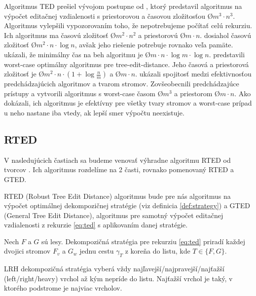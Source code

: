 Algoritmus TED prešiel vývojom postupne od \citet{TAI}, ktorý predstavil algoritmus
na výpočet editačnej vzdialenosti s priestorovou a časovou zložitosťou
\O{$m^3 \cdot n^3$}. Algoritmus vylepšili \citet{ZHANGSHASHA} vypozorovaním toho,
že nepotrebujeme počítať celú rekurziu. Ich algoritmus ma časovú zložitosť \O{$m^2 \cdot n^2$}
a priestorovú \O{$m \cdot n$}. \citet{KLEIN} dosiahol časovú zložitosť \O{$m^2 \cdot n \cdot \log{n}$},
avšak jeho riešenie potrebuje rovnako veľa pamäte.
\citet{DALUCQ} ukázali, že minimálny čas na beh algoritmu je \O{$m \cdot n \cdot \log{m} \cdot \log{n}$}.
\citet{DMRW} predstavili worst-case optimálny algoritmus pre tree-edit-distance.
Jeho časová a priestorová zložitosť je \O{$m^2 \cdot n \cdot (1 + \log{\frac{n}{m}})$} a
\O{$m \cdot n$}. \citet{RTED} ukázali spojitosť medzi efektivnosťou predchádzajúcich algoritmov
a tvarom stromov. Zovšeobecnili predchádzajúce prístupy a vytvorili algoritmus
s worst-case časom \O{$m^3$} a priestorom \O{$m \cdot n$}.
Ako dokázali, ich algoritmus je efektívny pre všetky tvary stromov a worst-case
prípad u neho nastane iba vtedy, ak lepší smer výpočtu neexistuje.





\subsection{RTED}

V nasledujúcich častiach sa budeme venovať výhradne algoritmu RTED od tvorcov \citet{RTED}.
Ich algoritmus rozdelíme na 2 časti, rovnako pomenovaný RTED a GTED.

RTED (Robust Tree Edit Distance) algoritmus bude pre nás algoritmus na výpočet
optimálnej dekompozičnej stratégie (viz definicia \ref{def:strategy})
a GTED (General Tree Edit Distance), algoritmus pre samotný výpočet editačnej
vzdialenosti z rekurzie \ref{eq:ted} s aplikovaním danej stratégie.

\begin{definice}
  \label{def:strategy}
	Nech $F$ a $G$ sú lesy. Dekompozičná stratégia pre rekurziu \ref{eq:ted} priradí
  každej dvojici stromov $F_{v}$ a $G_{w}$ jednu cestu $\gamma_{T}$
  z koreňa do listu, kde $T \in \{F, G\}$.

	LRH dekompozičná stratégia vyberá vždy najľavejší/najpravejší/najťažší
	(left/right/heavy) vrchol až kým nepríde do listu. Najťažší vrchol je taký,
	v ktorého podstrome je najviac vrcholov. 
\end{definice}


